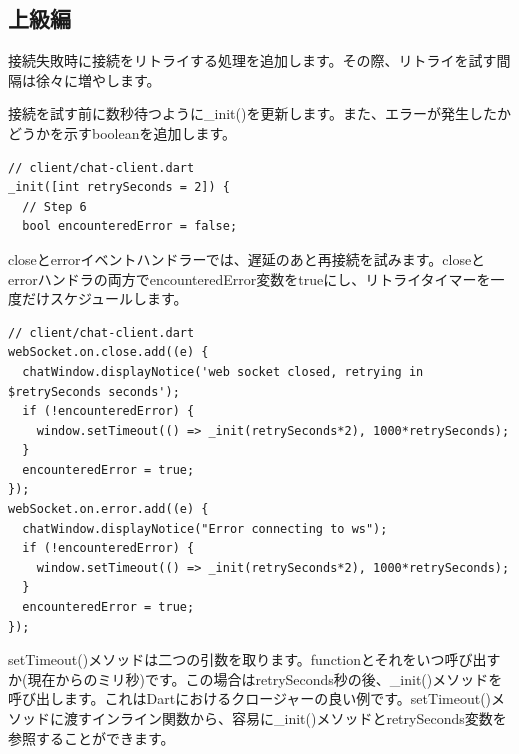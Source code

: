 \subsection{上級編}

接続失敗時に接続をリトライする処理を追加します。その際、リトライを試す間隔は徐々に増やします。

接続を試す前に数秒待つように\_init()を更新します。また、エラーが発生したかどうかを示すbooleanを追加します。

\begin{verbatim}
// client/chat-client.dart
_init([int retrySeconds = 2]) {
  // Step 6
  bool encounteredError = false;
\end{verbatim}

closeとerrorイベントハンドラーでは、遅延のあと再接続を試みます。closeとerrorハンドラの両方でencounteredError変数をtrueにし、リトライタイマーを一度だけスケジュールします。

\begin{verbatim}
// client/chat-client.dart
webSocket.on.close.add((e) {
  chatWindow.displayNotice('web socket closed, retrying in $retrySeconds seconds');
  if (!encounteredError) {
    window.setTimeout(() => _init(retrySeconds*2), 1000*retrySeconds);
  }
  encounteredError = true;
});
webSocket.on.error.add((e) {
  chatWindow.displayNotice("Error connecting to ws");
  if (!encounteredError) {
    window.setTimeout(() => _init(retrySeconds*2), 1000*retrySeconds);
  }
  encounteredError = true;
});
\end{verbatim}

setTimeout()メソッドは二つの引数を取ります。functionとそれをいつ呼び出すか(現在からのミリ秒)です。この場合はretrySeconds秒の後、\_init()メソッドを呼び出します。これはDartにおけるクロージャーの良い例です。setTimeout()メソッドに渡すインライン関数から、容易に\_init()メソッドとretrySeconds変数を参照することができます。

